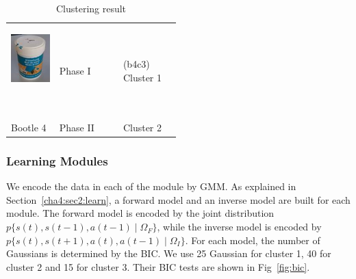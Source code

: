 \begin{table}
\begin{tabular}{p{1.6cm} p{1.6cm}|p{2cm} p{2cm} p{2cm}  p{2cm} }
{\parbox[c]{1em}{\includegraphics[width=1.5cm]{./fig_cha4/b4.jpg}}\newline }
         & Phase I  &           &           &{\vspace{-0.7cm}}\pbox{2cm}{(b4c3) \\Cluster 1} &           \\
Bootle 4 & Phase II &           &           &       Cluster 2 &           \\ \hline
\end{tabular}
\caption{Clustering result}
\label{tab:cluster}
\end{table}



\subsubsection{Learning Modules}
\label{cha4:sec3:learning:module}
We encode the data in each of the module by GMM. As explained in Section~\ref{cha4:sec2:learn}, a forward model and an inverse model are built for each module. The forward model is encoded by the joint distribution $p\{s(t),s(t-1),a(t-1)\mid\Omega_F\}$, while the inverse model is encoded by $p\{s(t),s(t+1),a(t),a(t-1)\mid\Omega_I\}$. For each model, the number of Gaussians is determined by the BIC. We use 25 Gaussian for cluster 1, 40 for cluster 2 and 15 for cluster 3. Their BIC tests are shown in Fig~\ref{fig:bic}.

